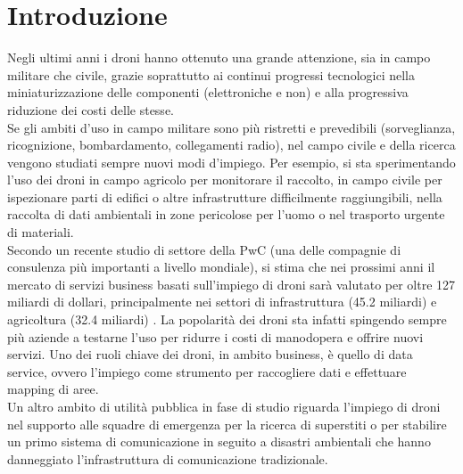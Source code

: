 
\chapter{Introduzione}  %

\ifpdf
    \graphicspath{{Chapter1/Figs/Raster/}{Chapter1/Figs/PDF/}{Chapter1/Figs/}}
\else
    \graphicspath{{Chapter1/Figs/Vector/}{Chapter1/Figs/}}
\fi

Negli ultimi anni i droni hanno ottenuto una grande attenzione, sia in campo militare che civile, grazie soprattutto ai continui progressi tecnologici nella miniaturizzazione delle componenti (elettroniche e non) e alla progressiva riduzione dei costi delle stesse. \\
Se gli ambiti d'uso in campo militare sono più ristretti e prevedibili (sorveglianza, ricognizione, bombardamento, collegamenti radio), nel campo civile e della ricerca vengono studiati sempre nuovi modi d'impiego. 
Per esempio, si sta sperimentando l'uso dei droni in campo agricolo per monitorare il raccolto, in campo civile per ispezionare parti di edifici o altre infrastrutture difficilmente raggiungibili, nella raccolta di dati ambientali in zone pericolose per l'uomo o nel trasporto urgente di materiali.\\
Secondo un recente studio di settore della PwC (una delle compagnie di consulenza più importanti a livello mondiale), si stima che nei prossimi anni il mercato di servizi business basati sull'impiego di droni sarà valutato per oltre 127 miliardi di dollari, principalmente nei settori di infrastruttura (45.2 miliardi) e agricoltura (32.4 miliardi) \cite{pwc2016}. La popolarità dei droni sta infatti spingendo sempre più aziende a testarne l'uso per ridurre i costi di manodopera e offrire nuovi servizi. Uno dei ruoli chiave dei droni, in ambito business, è quello di data service, ovvero l'impiego come strumento per raccogliere dati e effettuare mapping di aree. \\
Un altro ambito di utilità pubblica in fase di studio riguarda l'impiego di droni nel supporto alle squadre di emergenza per la ricerca di superstiti o per stabilire un primo sistema di comunicazione in seguito a disastri ambientali che hanno danneggiato l'infrastruttura di comunicazione tradizionale. \\
